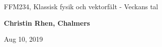 \documentclass[%
oneside,                 %
final,                   %
10pt]{article}
\begin{document}

\newcommand{\exercisesection}[1]{\subsection*{#1}}







\thispagestyle{empty}

\begin{center}
{\LARGE\bf
\begin{spacing}{1.25}
FFM234, Klassisk fysik och vektorfält - Veckans tal
\end{spacing}
}
\end{center}


\begin{center}
{\bf Christin Rhen, Chalmers${}^{}$} \\ [0mm]
\end{center}

\begin{center}
\end{center}
    

\begin{center}
Aug 10, 2019
\end{center}

\vspace{1cm}
\end{document}

